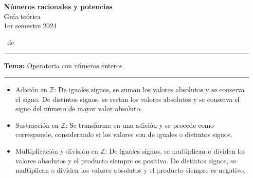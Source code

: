 \documentclass[spanish,letterpaper, 11pt, addpoints, answers]{exam}
\begin{document}

\begin{center}
\textbf{Números racionales y potencias} \\
Guía teórica\\
1er semestre 2024
\end{center}
\extraheadheight{-0.5in}

\runningheadrule \extraheadheight{0.15in}

\vspace{0.15in}
\runningheadrule \extraheadheight{0.14in}

\runningfooter{}
              {\thepage\ de \numpages}
              {}
\vspace{0.05in}

\nopointsinmargin
\setlength\linefillthickness{0.1pt}
\setlength\answerlinelength{0.1in}
\vspace{0.1in}
\hrule 

\vspace{0.1in}
\parbox{6in}{
\textbf{Tema:} Operatoria con números enteros}
\vspace{0.15in}
\hrule

\begin{itemize}
  \item Adición en $\mathbb{Z}$: De iguales signos, se suman los valores absolutos y se conserva el signo. De distintos signos, se restan los valores absolutos y se conserva el signo del número de mayor valor absoluto.
  \item Sustracción en $\mathbb{Z}$: Se transforma en una adición y se procede como corresponde, considerando si los valores son de iguales o distintos signos.
  \item Multiplicación y división en $\mathbb{Z}$: De iguales signos, se multiplican o dividen los valores absolutos y el producto siempre es positivo. De distintos signos, se multiplican o dividen los valores absolutos y el producto siempre es negativo.
\end{itemize}
\end{document}
